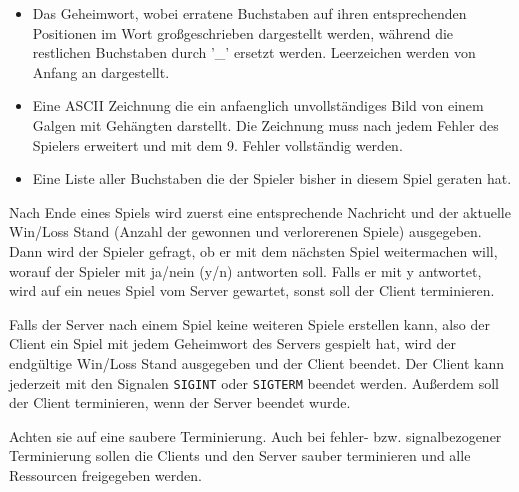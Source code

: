 \begin{itemize}
  \item Das Geheimwort, wobei erratene Buchstaben auf ihren entsprechenden
        Positionen im Wort großgeschrieben dargestellt werden, während die
        restlichen Buchstaben durch '\_' ersetzt werden.
        Leerzeichen werden von Anfang an dargestellt.
  \item Eine ASCII Zeichnung die ein anfaenglich unvollständiges Bild von einem
        Galgen mit Gehängten darstellt. Die Zeichnung muss nach jedem Fehler
        des Spielers erweitert und mit dem 9. Fehler vollständig werden.
  \item Eine Liste aller Buchstaben die der Spieler bisher in diesem Spiel
        geraten hat.
\end{itemize}

Nach Ende eines Spiels wird zuerst eine entsprechende Nachricht und der
aktuelle Win/Loss Stand (Anzahl der gewonnen und verlorerenen Spiele)
ausgegeben. Dann wird der Spieler gefragt, ob er mit dem nächsten Spiel
weitermachen will, worauf der Spieler mit ja/nein (y/n) antworten soll. Falls
er mit y antwortet, wird auf ein neues Spiel vom Server gewartet, sonst soll
der Client terminieren.

Falls der Server nach einem Spiel keine weiteren Spiele erstellen kann, also
der Client ein Spiel mit jedem Geheimwort des Servers gespielt hat, wird der
endgültige Win/Loss Stand ausgegeben und der Client beendet. Der Client kann
jederzeit mit den Signalen \verb|SIGINT| oder \verb|SIGTERM| beendet werden.
Außerdem soll der Client terminieren, wenn der Server beendet wurde.


Achten sie auf eine saubere Terminierung. Auch bei fehler- bzw. signalbezogener
Terminierung sollen die Clients und den Server sauber terminieren und alle
Ressourcen freigegeben werden.

\osueguidelinesthree


